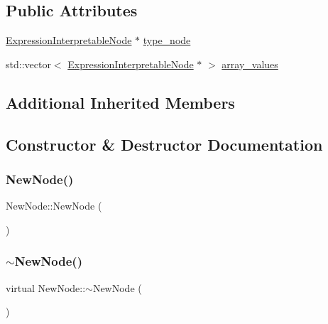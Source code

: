 \subsection*{Public Attributes}
\begin{DoxyCompactItemize}
\item 
\hyperlink{classExpressionInterpretableNode}{Expression\+Interpretable\+Node} $\ast$ \hyperlink{classNewNode_a1cf62395c1531a22ca8e1932ed82910c}{type\+\_\+node}
\item 
std\+::vector$<$ \hyperlink{classExpressionInterpretableNode}{Expression\+Interpretable\+Node} $\ast$ $>$ \hyperlink{classNewNode_afd78e7c3e05eb57a1536f705fb900fd5}{array\+\_\+values}
\end{DoxyCompactItemize}
\subsection*{Additional Inherited Members}


\subsection{Constructor \& Destructor Documentation}
\mbox{\label{classNewNode_a55edf2127f3cd875164a199029d7ebba}} 
\subsubsection{\texorpdfstring{New\+Node()}{NewNode()}}
{\footnotesize\ttfamily New\+Node\+::\+New\+Node (\begin{DoxyParamCaption}{ }\end{DoxyParamCaption})}

\mbox{\label{classNewNode_ab06c72bb48fc65bb12a21c1a6c3aa9c8}} 
\subsubsection{\texorpdfstring{$\sim$\+New\+Node()}{~NewNode()}}
{\footnotesize\ttfamily virtual New\+Node\+::$\sim$\+New\+Node (\begin{DoxyParamCaption}{ }\end{DoxyParamCaption})\hspace{0.3cm}{\ttfamily [virtual]}}



